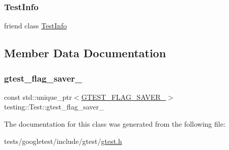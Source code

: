 \subsubsection{\texorpdfstring{Test\+Info}{TestInfo}}
{\footnotesize\ttfamily friend class \hyperlink{classtesting_1_1TestInfo}{Test\+Info}\hspace{0.3cm}{\ttfamily [friend]}}



\subsection{Member Data Documentation}
\mbox{\label{classtesting_1_1Test_a7801584e65ac93e641916baa14f03943}} 
\subsubsection{\texorpdfstring{gtest\+\_\+flag\+\_\+saver\+\_\+}{gtest\_flag\_saver\_}}
{\footnotesize\ttfamily const std\+::unique\+\_\+ptr$<$\hyperlink{gtest-port_8h_a3749ef4fba6b3c3993609b336031644d}{G\+T\+E\+S\+T\+\_\+\+F\+L\+A\+G\+\_\+\+S\+A\+V\+E\+R\+\_\+}$>$ testing\+::\+Test\+::gtest\+\_\+flag\+\_\+saver\+\_\+\hspace{0.3cm}{\ttfamily [private]}}



The documentation for this class was generated from the following file\+:\begin{DoxyCompactItemize}
\item 
tests/googletest/include/gtest/\hyperlink{gtest_8h}{gtest.\+h}\end{DoxyCompactItemize}
